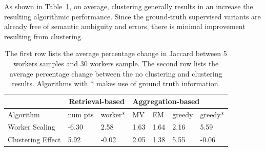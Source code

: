 \par \noindent As shown in Table~\ref{statsTable}, on average, clustering generally results in an increase the resulting algorithmic performance. Since the ground-truth supervised variants are already free of semantic ambiguity and errors, there is minimal improvement resulting from clustering. %

\begin{table}[h!]
   \small
     \setlength\tabcolsep{1.5pt}
      \begin{tabular}{l|l|l|l|l|l|l}
         & \multicolumn{2}{c|}{Retrieval-based} & \multicolumn{4}{l}{Aggregation-based} \\ \hline
      Algorithm         & num pts         & worker*        & MV    & EM    & greedy  & greedy*  \\ \hline
      Worker Scaling    & -6.30           & 2.58               & 1.63  & 1.64  & 2.16    & 5.59         \\ \hline
      Clustering Effect & 5.92            & -0.02              & 2.05  & 1.38  & 5.55    & -0.06       
      \end{tabular}
      \caption{The first row lists the average percentage change in Jaccard between 5 workers samples and 30 workers sample. The second row lists the average percentage change between the no clustering and clustering results. Algorithms with * makes use of ground truth information.}
      \label{statsTable}
\end{table}